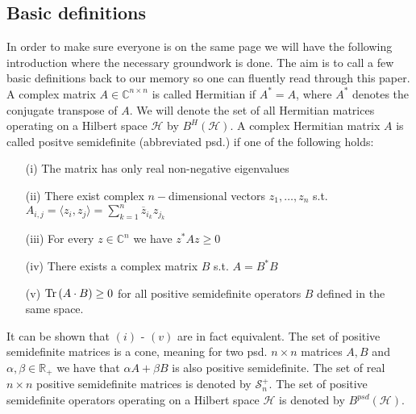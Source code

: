 \subsection{Basic definitions}
In order to make sure everyone is on the same page we will have the following introduction where the necessary groundwork is done. The aim is to call a few basic definitions back to our memory so one can fluently read through this paper. \\
A complex matrix $A \in \mathbb{C}^{n \times n}$ is called Hermitian if $A^*=A$, where $A^*$ denotes the conjugate transpose of $A$. We will denote the set of all Hermitian matrices operating on a Hilbert space $\mathcal{H}$ by $B^{H}(\mathcal{H})$. A complex Hermitian matrix $A$ is called positve semidefinite (abbreviated psd.) if one of the following holds: 
\begin{enumerate}
\item[(i)] The matrix has only real non-negative eigenvalues 
\item[(ii)] There exist complex $n-$dimensional vectors $z_1, \dots, z_n$ s.t. $A_{i,j} = \langle z_i, z_j \rangle = \sum_{k=1}^n \overline{z}_{i_k}z_{j_k}$
\item[(iii)] For every $z \in \mathbb{C}^n$ we have $z^*Az\ge 0$
\item[(iv)] There exists a complex matrix $B$ s.t. $A=B^*B$
\item[(v)] $\text{Tr} \, {(A\cdot B)}  \ge 0 $ for all positive semidefinite operators $ B $ defined in the same space. 
\end{enumerate}
It can be shown that $(i)$ - $(v)$ are in fact equivalent. The set of positive semidefinite matrices is a cone, meaning for two psd. $n \times n$ matrices $A,B$ and $\alpha, \beta \in \mathbb{R}_+$ we have that $\alpha A + \beta B $ is also positive semidefinite. The set of real $n \times n$ positive semidefinite matrices is denoted by $\mathcal{S}_n^+$. The set of positive semidefinite operators operating on a Hilbert space $\mathcal{H}$ is denoted by $B^{psd}(\mathcal{H})$.\\
